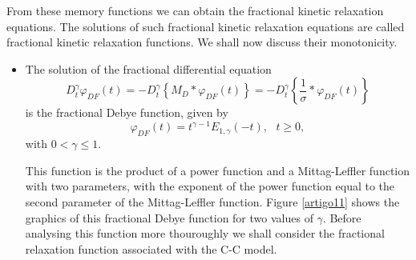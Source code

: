 \documentclass[12pt]{amsart}
\numberwithin{equation}{section}
\begin{document}
From these memory functions we can obtain the fractional kinetic relaxation
equations. The solutions of such fractional kinetic relaxation equations are
called fractional kinetic relaxation functions. We shall now discuss their
monotonicity.


\begin{itemize}
\item The solution of the fractional differential equation 
\begin{equation}
D^{\gamma}_{t}\varphi_{DF}(t)=
- D^{\gamma}_{t}\left\{M_{D}\ast\varphi_{DF}(t)\right\}=
- D^{\gamma}_{t}\left\{\frac{1}{\sigma}\ast\varphi_{DF}(t)\right\}
\label{debyef1}
\end{equation}
is the fractional Debye function, given by 
\begin{equation}
\varphi_{DF}(t)= t^{\gamma-1}E_{1,\gamma}(-t),\,\,\,\,t\geq0,
\label{artigo9}
\end{equation}
with $0<\gamma\leq 1$. 

This function is the product of a power function and a
		Mittag-Leffler function with two parameters, with the
		exponent of the power function equal to the second
		parameter of the Mittag-Leffler function. Figure
		\ref{artigo11} shows the graphics of this fractional Debye
		function  for two values of $\gamma$.  Before analysing
		this function more thouroughly we shall consider the
		fractional relaxation function associated with the C-C
		model. 



\end{itemize}
\end{document}
